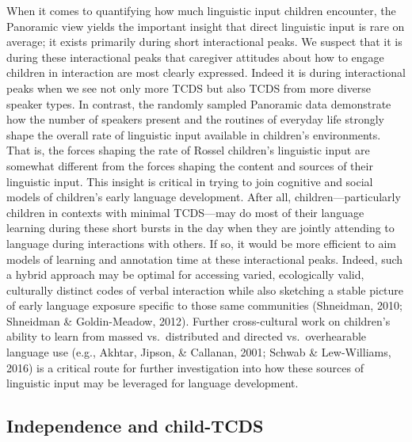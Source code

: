 \documentclass[,man,floatsintext]{apa6}
\begin{document}
When it comes to quantifying how much linguistic input children
encounter, the Panoramic view yields the important insight that direct
linguistic input is rare on average; it exists primarily during short
interactional peaks. We suspect that it is during these interactional
peaks that caregiver attitudes about how to engage children in
interaction are most clearly expressed. Indeed it is during
interactional peaks when we see not only more TCDS but also TCDS from
more diverse speaker types. In contrast, the randomly sampled Panoramic
data demonstrate how the number of speakers present and the routines of
everyday life strongly shape the overall rate of linguistic input
available in children's environments. That is, the forces shaping the
rate of Rossel children's linguistic input are somewhat different from
the forces shaping the content and sources of their linguistic input.
This insight is critical in trying to join cognitive and social models
of children's early language development. After all,
children---particularly children in contexts with minimal TCDS---may do
most of their language learning during these short bursts in the day
when they are jointly attending to language during interactions with
others. If so, it would be more efficient to aim models of learning and
annotation time at these interactional peaks. Indeed, such a hybrid
approach may be optimal for accessing varied, ecologically valid,
culturally distinct codes of verbal interaction while also sketching a
stable picture of early language exposure specific to those same
communities (Shneidman, 2010; Shneidman \& Goldin-Meadow, 2012). Further
cross-cultural work on children's ability to learn from massed
vs.~distributed and directed vs.~overhearable language use (e.g.,
Akhtar, Jipson, \& Callanan, 2001; Schwab \& Lew-Williams, 2016) is a
critical route for further investigation into how these sources of
linguistic input may be leveraged for language development.

\subsection{Independence and
child-TCDS}\label{independence-and-child-tcds}
\end{document}
